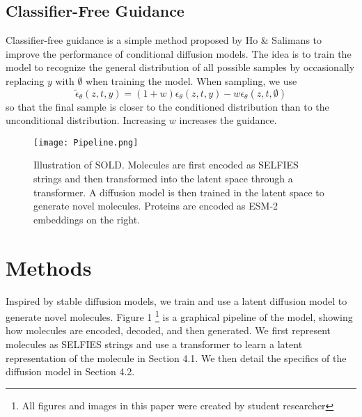 \documentclass[11pt]{article}
\begin{document}
\subsection{Classifier-Free Guidance}
Classifier-free guidance is a simple method proposed by
Ho \& Salimans \cite{ho2022classifierfreediffusionguidance} to improve the performance
of conditional diffusion models. The idea is to train the model to 
recognize the general distribution of all possible samples by
occasionally replacing $y$ with $\emptyset$ when training the model.
When sampling, we use 
\begin{equation}
    \tilde{\epsilon}_{\theta}(z, t, y) = (1 + w)\epsilon_{\theta}(z, t, y)
    - w\epsilon_{\theta}(z, t, \emptyset)
\end{equation}
so that the final sample is closer to the conditioned distribution
than to the unconditional distribution. Increasing $w$ increases the 
guidance. 

\begin{figure*}[ht]
    \centering
    \texttt{[image: Pipeline.png]}
    \caption{Illustration of SOLD. 
    Molecules are first 
    encoded as SELFIES strings and then transformed into the 
    latent space through a transformer. A diffusion model 
    is then trained in the latent space to generate novel
    molecules. Proteins are encoded as ESM-2 embeddings on the 
    right.}
\end{figure*}

\section{Methods}
Inspired by stable diffusion models, we train and use a latent
diffusion model to generate novel molecules. Figure 1 \footnote{All figures and images in 
this paper were created by student researcher} is a graphical 
pipeline of the model, showing how molecules are encoded, decoded, and then 
generated. We first represent
molecules as SELFIES strings and use a transformer to learn a 
latent representation of the molecule in Section 4.1. We then
detail the specifics of the diffusion model in Section 4.2. 
\end{document}
